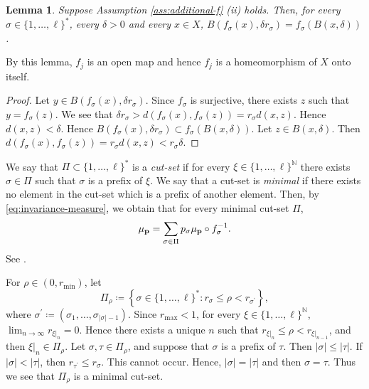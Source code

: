 \documentclass[10pt,a4paper]{amsart}
\newtheorem{Lem}[Thm]{Lemma}
\begin{document}
\begin{Lem}\label{lem:ball-surjection}
Suppose Assumption \ref{ass:additional-f} (ii) holds. 
Then, for every $\sigma \in \{1,\dots, \ell\}^*$, every $\delta > 0$ and every $x \in X$, 
$B(f_{\sigma}(x), \delta r_{\sigma}) = f_{\sigma}(B(x,\delta))$. 
\end{Lem}

By this lemma, $f_j$ is an open map and hence $f_j$ is a homeomorphism of $X$ onto itself. 

\begin{proof}
Let $y \in B(f_{\sigma}(x), \delta r_{\sigma})$. 
Since $f_{\sigma}$ is surjective, 
there exists $z$ such that $y = f_{\sigma}(z)$. 
We see that $\delta r_{\sigma} > d(f_{\sigma}(x), f_{\sigma}(z)) = r_{\sigma} d(x,z)$.
Hence $d(x,z) < \delta$. 
Hence $B(f_{\sigma}(x), \delta r_{\sigma}) \subset f_{\sigma}(B(x,\delta))$. 
Let $z \in B(x,\delta)$. 
Then $d(f_{\sigma}(x), f_{\sigma}(z)) = r_{\sigma} d(x,z) < r_{\sigma} \delta$. 
\end{proof}


We say that $\Pi \subset \{1,\dots, \ell\}^{*}$ is a {\it cut-set} if for every $\xi \in \{1,\dots, \ell\}^{\mathbb N}$ there exists $\sigma \in \Pi$ such that $\sigma$ is a prefix of $\xi$. 
We say that a cut-set is {\it minimal} if there exists no element in the cut-set which is a prefix of another element. 
Then, by \eqref{eq:invariance-measure}, 
we obtain that for every minimal cut-set $\Pi$, 
\begin{equation}\label{eq:invariance-min-cutset}
\mu_{\bf p} = \sum_{\sigma \in \Pi} p_{\sigma} \mu_{\bf p} \circ f_{\sigma}^{-1}.
\end{equation}
See \cite[Lemma 2.2.4 (ii)]{BishopPeres2017}. 

For $\rho \in (0, r_{\min})$, 
let 
\begin{equation}\label{eq:def-cutset-1} 
\Pi_{\rho} \coloneqq \left\{\sigma \in \{1,\dots, \ell\}^{*} \colon r_{\sigma} \le \rho < r_{\sigma^{\prime}} \right\}, 
\end{equation}
where $\sigma^{\prime} \coloneqq (\sigma_1, \dots, \sigma_{|\sigma|-1})$. 
Since $r_{\max} < 1$, for every $\xi \in \{1,\dots, \ell\}^{\mathbb N}$, 
$\lim_{n \to \infty} r_{\xi|_n} = 0$. 
Hence there exists a unique $n$ such that $r_{\xi|_n} \le \rho < r_{\xi|_{n-1}}$, and then $\xi|_n \in \Pi_{\rho}$. 
Let $\sigma, \tau \in \Pi_{\rho}$, and suppose that $\sigma$ is a prefix of $\tau$. 
Then $|\sigma| \le |\tau|$. 
If $|\sigma| < |\tau|$, then $r_{\tau^{\prime}} \le r_{\sigma}$. 
This cannot occur. 
Hence, $|\sigma| = |\tau|$ and then $\sigma = \tau$. 
Thus we see that $\Pi_{\rho}$ is a minimal cut-set. 
\end{document}
